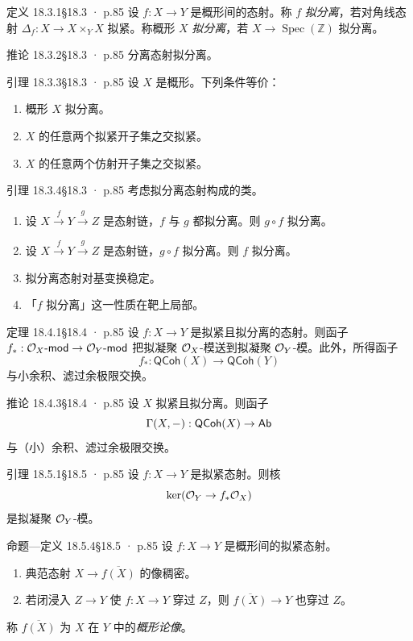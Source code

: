 \documentclass[UTF8,10pt,fontset=windows]{ctexart}
\newcommand{\Z}{\mathbb{Z}}\newcommand{\Q}{\mathbb{Q}}\newcommand{\R}{\mathbb{R}}
\newcommand{\Spec}{\operatorname{Spec}}\newcommand{\Spm}{\operatorname{Spm}}
\newcommand{\omod}{\cO_X\text{-}\mathsf{mod}}
\begin{document}
\begin{card}{定义 18.3.1}{§18.3 · p.85}
设 $f:X\to Y$ 是概形间的态射。称 $f$ \emph{拟分离}，若对角线态射 $\Delta_f:X\to X\times_Y X$ 拟紧。称概形 $X$ \emph{拟分离}，若 $X\to\Spec(\Z)$ 拟分离。
\end{card}
\begin{card}{推论 18.3.2}{§18.3 · p.85}
分离态射拟分离。
\end{card}
\begin{card}{引理 18.3.3}{§18.3 · p.85}
设 $X$ 是概形。下列条件等价：
\begin{enumerate}[label=(\roman*),leftmargin=2em,itemsep=0.25ex]
  \item 概形 $X$ 拟分离。
  \item $X$ 的任意两个拟紧开子集之交拟紧。
  \item $X$ 的任意两个仿射开子集之交拟紧。
\end{enumerate}
\end{card}
\begin{card}{引理 18.3.4}{§18.3 · p.85}
考虑拟分离态射构成的类。
\begin{enumerate}[label=(\roman*),leftmargin=2em,itemsep=0.25ex]
  \item 设 $X\xrightarrow{f}Y\xrightarrow{g}Z$ 是态射链，$f$ 与 $g$ 都拟分离。则 $g\circ f$ 拟分离。
  \item 设 $X\xrightarrow{f}Y\xrightarrow{g}Z$ 是态射链，$g\circ f$ 拟分离。则 $f$ 拟分离。
  \item 拟分离态射对基变换稳定。
  \item 「$f$ 拟分离」这一性质在靶上局部。
\end{enumerate}
\end{card}
\begin{card}{定理 18.4.1}{§18.4 · p.85}
设 $f:X\to Y$ 是拟紧且拟分离的态射。则函子 $f_*:\omod\to\cO_Y\text{-}\mathsf{mod}$ 把拟凝聚 $\mathcal{O}_X$-模送到拟凝聚 $\mathcal{O}_Y$-模。此外，所得函子
\[
f_*:\mathsf{QCoh}(X)\to\mathsf{QCoh}(Y)
\]
与小余积、滤过余极限交换。
\end{card}
\begin{card}{推论 18.4.3}{§18.4 · p.85}
设 $X$ 拟紧且拟分离。则函子
\[
\Gamma(X,-):\mathsf{QCoh}(X)\to\mathsf{Ab}
\]
与（小）余积、滤过余极限交换。
\end{card}
\begin{card}{引理 18.5.1}{§18.5 · p.85}
设 $f:X\to Y$ 是拟紧态射。则核
\[
\ker(\mathcal{O}_Y\to f_*\mathcal{O}_X)
\]
是拟凝聚 $\mathcal{O}_Y$-模。
\end{card}
\begin{card}{命题—定义 18.5.4}{§18.5 · p.85}
设 $f:X\to Y$ 是概形间的拟紧态射。
\begin{enumerate}[label=(\roman*),leftmargin=2em,itemsep=0.25ex]
  \item 典范态射 $X\to\overline{f(X)}$ 的像稠密。
  \item 若闭浸入 $Z\to Y$ 使 $f:X\to Y$ 穿过 $Z$，则 $\overline{f(X)}\to Y$ 也穿过 $Z$。
\end{enumerate}
称 $\overline{f(X)}$ 为 $X$ 在 $Y$ 中的\emph{概形论像}。
\end{card}
\end{document}
